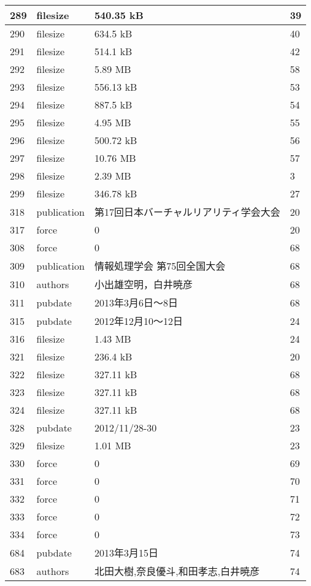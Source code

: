 \begin{longtable}{|l|l|l|l|}
289 & filesize & 540.35 kB & 39 \\ \hline 
290 & filesize & 634.5 kB & 40 \\ \hline 
291 & filesize & 514.1 kB & 42 \\ \hline 
292 & filesize & 5.89 MB & 58 \\ \hline 
293 & filesize & 556.13 kB & 53 \\ \hline 
294 & filesize & 887.5 kB & 54 \\ \hline 
295 & filesize & 4.95 MB & 55 \\ \hline 
296 & filesize & 500.72 kB & 56 \\ \hline 
297 & filesize & 10.76 MB & 57 \\ \hline 
298 & filesize & 2.39 MB & 3 \\ \hline 
299 & filesize & 346.78 kB & 27 \\ \hline 
318 & publication & 第17回日本バーチャルリアリティ学会大会 & 20 \\ \hline 
317 & force & 0 & 20 \\ \hline 
308 & force & 0 & 68 \\ \hline 
309 & publication & 情報処理学会 第75回全国大会 & 68 \\ \hline 
310 & authors & 小出雄空明，白井暁彦 & 68 \\ \hline 
311 & pubdate & 2013年3月6日～8日 & 68 \\ \hline 
315 & pubdate & 2012年12月10～12日 & 24 \\ \hline 
316 & filesize & 1.43 MB & 24 \\ \hline 
321 & filesize & 236.4 kB & 20 \\ \hline 
322 & filesize & 327.11 kB & 68 \\ \hline 
323 & filesize & 327.11 kB & 68 \\ \hline 
324 & filesize & 327.11 kB & 68 \\ \hline 
328 & pubdate & 2012/11/28-30 & 23 \\ \hline 
329 & filesize & 1.01 MB & 23 \\ \hline 
330 & force & 0 & 69 \\ \hline 
331 & force & 0 & 70 \\ \hline 
332 & force & 0 & 71 \\ \hline 
333 & force & 0 & 72 \\ \hline 
334 & force & 0 & 73 \\ \hline 
684 & pubdate & 2013年3月15日 & 74 \\ \hline 
683 & authors & 北田大樹,奈良優斗,和田孝志,白井暁彦 & 74 \\ \hline 

\end{longtable}
